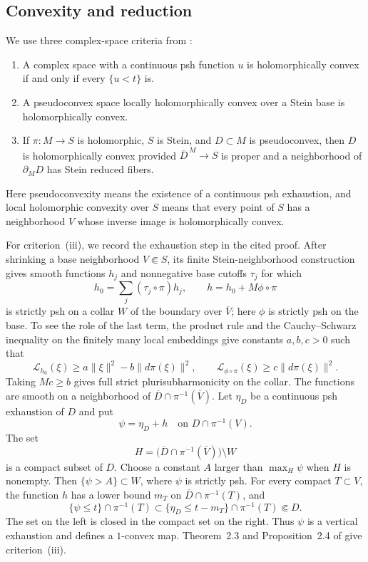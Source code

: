 \documentclass[11pt]{amsart}
\theoremstyle{definition}
\theoremstyle{remark}
\numberwithin{equation}{section}
\newcommand{\Levi}{\mathcal L}
\begin{document}
\subsection{Convexity and reduction}
We use three complex-space criteria from
\cite[Propositions~2.2, 2.4 and Corollary~2.5]{VijituForum2022}:
\begin{enumerate}[label=\textup{(\roman*)},leftmargin=2.5em]
\item A complex space with a continuous psh function $u$ is
holomorphically convex if and only if every $\{u<t\}$ is.
\item A pseudoconvex space locally holomorphically convex over a
Stein base is holomorphically convex.
\item If $\pi:M\to S$ is holomorphic, $S$ is Stein, and
$D\subset M$ is pseudoconvex, then $D$ is holomorphically convex
provided $\overline D^{\,M}\to S$ is proper and a neighborhood
of $\partial_M D$ has Stein reduced fibers.
\end{enumerate}
Here pseudoconvexity means the existence of a continuous psh
exhaustion, and local holomorphic convexity over $S$ means that
every point of $S$ has a neighborhood $V$ whose inverse image is
holomorphically convex.

For criterion~\textup{(iii)}, we record the exhaustion step in the
cited proof. After shrinking a base neighborhood $V\Subset S$, its
finite Stein-neighborhood construction gives smooth functions $h_j$
and nonnegative base cutoffs $\tau_j$ for which
\[
 h_0=\sum_j(\tau_j\circ\pi)h_j,\qquad
 h=h_0+M\phi\circ\pi
\]
is strictly psh on a collar $W$ of the boundary over $\overline V$;
here $\phi$ is strictly psh on the base. To see the role of the last
term, the product rule and the Cauchy--Schwarz inequality on the
finitely many local embeddings give constants $a,b,c>0$ such that
\[
 \Levi_{h_0}(\xi)\ge a\|\xi\|^2-b\|d\pi(\xi)\|^2,
 \qquad
 \Levi_{\phi\circ\pi}(\xi)\ge c\|d\pi(\xi)\|^2.
\]
Taking $Mc\ge b$ gives full strict plurisubharmonicity on the collar.
The functions are smooth on a neighborhood of
$\overline D\cap\pi^{-1}(\overline V)$. Let $\eta_D$ be a continuous
psh exhaustion of $D$ and put
\[
 \psi=\eta_D+h\quad\text{on }D\cap\pi^{-1}(V).
\]
The set
\[
 H=\bigl(\overline D\cap\pi^{-1}(\overline V)\bigr)\setminus W
\]
is a compact subset of $D$. Choose a constant $A$ larger than
$\max_H\psi$ when $H$ is nonempty. Then $\{\psi>A\}\subset W$,
where $\psi$ is strictly psh. For every compact $T\subset V$, the
function $h$ has a lower bound $m_T$ on
$\overline D\cap\pi^{-1}(T)$, and
\[
 \{\psi\le t\}\cap\pi^{-1}(T)
 \subset\{\eta_D\le t-m_T\}\cap\pi^{-1}(T)\Subset D.
\]
The set on the left is closed in the compact set on the right.
Thus $\psi$ is a vertical exhaustion and defines a $1$-convex map.
Theorem~2.3 and Proposition~2.4 of \cite{VijituForum2022} give
criterion~\textup{(iii)}.
\end{document}
